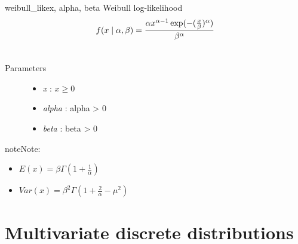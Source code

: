 \hypertarget{pymc.distributions.weibull_like}{}\begin{funcdesc}{weibull\_like}{x, alpha, beta}
Weibull log-likelihood
\begin{gather}
\begin{split}f(x \mid \alpha, \beta) = \frac{\alpha x^{\alpha - 1}
\exp(-(\frac{x}{\beta})^{\alpha})}{\beta^\alpha}\end{split}\notag\\\begin{split}\end{split}\notag
\end{gather}\begin{description}
\item[Parameters] \leavevmode\begin{itemize}
\item {}
\emph{x} : $x \ge 0$

\item {}
\emph{alpha} : alpha \textgreater{} 0

\item {}
\emph{beta} : beta \textgreater{} 0

\end{itemize}

\end{description}

\begin{notice}{note}{Note:}\begin{itemize}
\item {}
$E(x)=\beta \Gamma(1+\frac{1}{\alpha})$

\item {}
$Var(x)=\beta^2 \Gamma(1+\frac{2}{\alpha} - \mu^2)$

\end{itemize}
\end{notice}
\end{funcdesc}


\section{Multivariate discrete distributions}

